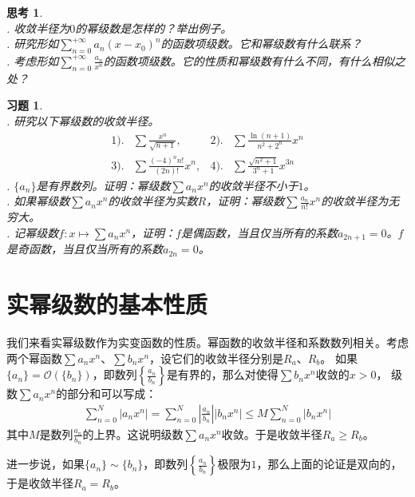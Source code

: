 \documentclass[12pt,UTF8]{ctexbook}
\newcommand{\Olim}[1]{\mathcal{O}\left(#1\right)}  %
\theoremstyle{definition}
\theoremstyle{plain}
\newtheorem{sk}{思考}[section]
\newtheorem{xt}{习题}[section]
\begin{document}
\begin{sk}
    \mbox{} \\
    . 收敛半径为$0$的幂级数是怎样的？举出例子。 \\
    . 研究形如$\sum_{n=0}^{+\infty} a_n (x - x_0)^n$的函数项级数。它和幂级数有什么联系？\\
    . 考虑形如$\sum_{n=0}^{+\infty} \frac{a_n}{x^n}$的函数项级数。它的性质和幂级数有什么不同，有什么相似之处？
\end{sk}

\begin{xt}    
    \mbox{} \\
    . 研究以下幂级数的收敛半径。\\
    \begin{align*}
        1).& \sum \frac{x^n}{\sqrt{n+1}} ,  &2).& \sum \frac{\ln{(n+1)}}{n^2 + 2^n} x^n \\
        3).& \sum \frac{(-4)^n n!}{(2n)!} x^n,  & 4).& \sum \frac{\sqrt{n^2+1}}{3^n+1} x^{3n} 
    \end{align*}
    . $\{a_n\}$是有界数列。证明：幂级数$\sum a_n x^n$的收敛半径不小于$1$。\\
    . 如果幂级数$\sum a_n x^n$的收敛半径为实数$R$，证明：幂级数$\sum \frac{a_n}{n!} x^n$的收敛半径为无穷大。\\
    . 记幂级数$f: x\mapsto \sum a_n x^n $，证明：$f$是偶函数，当且仅当所有的系数$a_{2n+1} = 0$。$f$是奇函数，当且仅当所有的系数$a_{2n} = 0$。
\end{xt}

\section{实幂级数的基本性质}

我们来看实幂级数作为实变函数的性质。幂函数的收敛半径和系数数列相关。考虑两个幂函数$\sum a_n x^n$、$\sum b_n x^n$，设它们的收敛半径分别是$R_a$、$R_b$。
如果$\{a_n\} = \Olim{\{b_n\}}$，即数列$\left\{\frac{a_n}{b_n}\right\}$是有界的，那么对使得$\sum b_n x^n$收敛的$x>0$，
级数$\sum a_n x^n$的部分和可以写成：
\begin{align*}
    \sum_{n=0}^{N} |a_n x^n| = \sum_{n=0}^{N} \left|\frac{a_n}{b_n}\right| |b_n x^n| \leqslant M \sum_{n=0}^{N} |b_n x^n|
\end{align*}
其中$M$是数列$\frac{a_n}{b_n}$的上界。这说明级数$\sum a_n x^n$收敛。于是收敛半径$R_a \geqslant R_b$。

进一步说，如果$\{a_n\} \sim \{b_n\}$，即数列$\left\{\frac{a_n}{b_n}\right\}$极限为$1$，那么上面的论证是双向的，于是收敛半径$R_a = R_b$。
\end{document}
